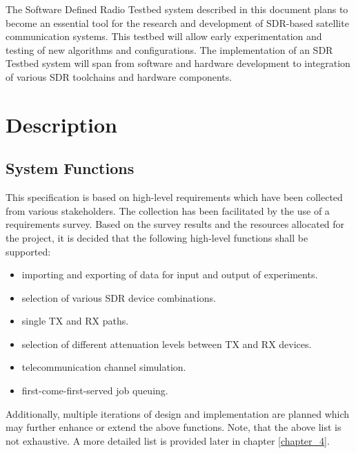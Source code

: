 \documentclass[english,titlepage,a4paper]{report}
\begin{document}
The Software Defined Radio Testbed system described in this document plans to become an essential tool for the research and development of \acrshort{SDR}-based satellite communication systems.
This testbed will allow early experimentation and testing of new algorithms and configurations.
The implementation of an \gls{SDR Testbed} system will span from software and hardware development to integration of various \acrshort{SDR} toolchains and hardware components.

\newpage
\printglossary[type=references,numberedsection,style=references,nonumberlist]

\chapter{Description}
\section{System Functions}

This specification is based on high-level requirements which have been collected from various stakeholders.
The collection has been facilitated by the use of a requirements survey.
Based on the survey results and the resources allocated for the project, it is decided that the following high-level functions shall be supported:
\begin{itemize}
\item importing and exporting of data for input and output of \glspl{experiment}.
\item selection of various SDR device combinations.
\item single \acrshort{TX} and \acrshort{RX} paths.
\item selection of different attenuation levels between \acrshort{TX} and \acrshort{RX} devices.
\item telecommunication channel simulation.
\item first-come-first-served \gls{job} queuing.
\end{itemize}

Additionally, multiple iterations of design and implementation are planned which may further enhance or extend the above functions.
Note, that the above list is not exhaustive.
A more detailed list is provided later in chapter \ref{chapter_4}.
\end{document}
